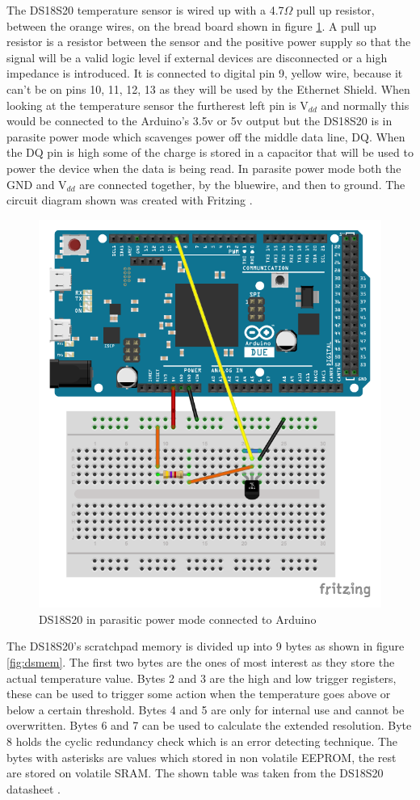 The DS18S20 temperature sensor is wired up with a 4.7$\Omega$ pull up resistor, between the orange wires, on the bread board shown in figure \ref{fig:tempcircuit}. A pull up resistor is a resistor between the sensor and the positive power supply so that the signal will be a valid logic level if external devices are disconnected or a high impedance is introduced. It is connected to digital pin 9, yellow wire, because it can't be on pins 10, 11, 12, 13 as they will be used by the Ethernet Shield. When looking at the temperature sensor the furtherest left pin is V$_{dd}$ and normally this would be connected to the Arduino's 3.5v or 5v output but the DS18S20 is in parasite power mode which scavenges power off the middle data line, DQ. When the DQ pin is high some of the charge is stored in a capacitor that will be used to power the device when the data is being read. In parasite power mode both the GND and V$_{dd}$ are connected together, by the bluewire, and then to ground. The circuit diagram shown was created with Fritzing \cite{fritz}.

\begin{figure}[H]
	\centering
	\includegraphics[width=.5\linewidth]{Figures/TempSensor_bb.pdf}
	\caption{DS18S20 in parasitic power mode connected to Arduino}
	\label{fig:tempcircuit}
\end{figure}

The DS18S20's scratchpad memory is divided up into 9 bytes as shown in figure \ref{fig:dsmem}. The first two bytes are the ones of most interest as they store the actual temperature value. Bytes 2 and 3 are the high and low trigger registers, these can be used to trigger some action when the temperature goes above or below a certain threshold. Bytes 4 and 5 are only for internal use and cannot be overwritten. Bytes 6 and 7 can be used to calculate the extended resolution. Byte 8 holds the cyclic redundancy check which is an error detecting technique. The bytes with asterisks are values which stored in non volatile EEPROM, the rest are stored on volatile SRAM. The shown table was taken from the DS18S20 datasheet \cite{dsdatasheet}.

